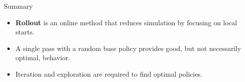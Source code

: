 \documentclass[9pt]{beamer}
\newcommand\lspace{\addtolength{\itemsep}{0.5\baselineskip}}
\begin{document}
\begin{frame}{Summary}

\begin{itemize}\lspace
	\item \textbf{Rollout} is an online method that reduces simulation by focusing on local starts.
	\item A single pass with a random base policy provides good, but not necessarily optimal, behavior.
	\item Iteration and exploration are required to find optimal policies.
\end{itemize}

\end{frame}
\end{document}
